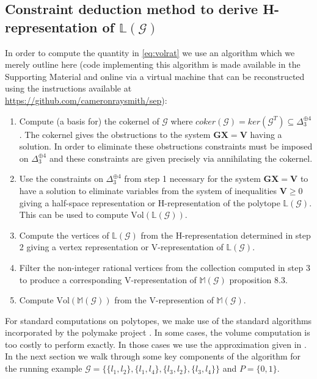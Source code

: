 \subsection{Constraint deduction method to derive H-representation of $\mathbb{L}(\mathcal{G})$}
In order to compute the quantity in \ref{eq:volrat} we use an algorithm which we merely outline here (code implementing this algorithm is made available in the Supporting Material and online via a virtual machine that can be reconstructed using the instructions available at \\ \href{https://github.com/cameronraysmith/sep}{https://github.com/cameronraysmith/sep}):
\begin{enumerate}
\item Compute (a basis for) the cokernel of $\mathcal{G}$ where $coker(\mathcal{G}) = ker(\mathcal{G}^T) \subseteq \Delta_3^{\oplus 4}$. The cokernel gives the obstructions to the system $\mathbf{G}\mathbf{X}=\mathbf{V}$ having a solution. In order to eliminate these obstructions constraints must be imposed on $\Delta_3^{\oplus 4}$ and these constraints are given precisely via annihilating the cokernel.
\item Use the constraints on $\Delta_3^{\oplus 4}$ from step 1 necessary for the system $\mathbf{G}\mathbf{X}=\mathbf{V}$ to have a solution to eliminate variables from the system of inequalities $\mathbf{V} \geq 0$ giving a half-space representation or H-representation of the polytope $\mathbb{L}(\mathcal{G})$. This can be used to compute $\text{Vol}(\mathbb{L}(\mathcal{G}))$.
\item Compute the vertices of $\mathbb{L}(\mathcal{G})$ from the H-representation determined in step 2 giving a vertex representation or V-representation of $\mathbb{L}(\mathcal{G})$.
\item Filter the non-integer rational vertices from the collection computed in step 3 to produce a corresponding V-representation of $\mathbb{M}(\mathcal{G})$ \cite{Wainwright2007} proposition 8.3.
\item Compute $\text{Vol}(\mathbb{M}(\mathcal{G}))$ from the V-represention of $\mathbb{M}(\mathcal{G})$.
\end{enumerate}
For standard computations on polytopes, we make use of the standard algorithms incorporated by the polymake project \cite{Gawrilow2000}. In some cases, the volume computation is too costly to perform exactly. In those cases we use the approximation given in \cite{Cousins}. In the next section we walk through some key components of the algorithm for the running example $\mathcal{G} = \{\{l_1,l_2 \},\{l_1,l_4 \},\{l_3,l_2\},\{l_3,l_4\} \}$ and $P=\{0,1\}$.

